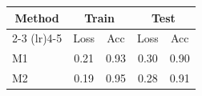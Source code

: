 \begin{table}[htbp]
\centering
\begin{tabular}{lcccc}
\toprule
\multicolumn{1}{c}{Method} & \multicolumn{2}{c}{Train} & \multicolumn{2}{c}{Test} \\
\cmidrule(lr){2-3} \cmidrule(lr){4-5}
 & Loss & Acc & Loss & Acc \\
\midrule
M1 & 0.21 & 0.93 & 0.30 & 0.90 \\
M2 & 0.19 & 0.95 & 0.28 & 0.91 \\
\bottomrule
\end{tabular}
\end{table}
